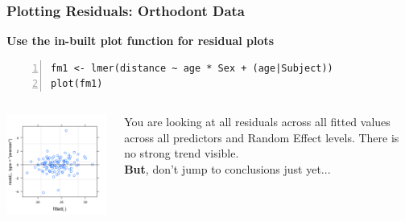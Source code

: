 \documentclass{beamer}
\begin{document}
\begin{frame}[fragile]
    \frametitle{Plotting Residuals: Orthodont Data}
    \textbf{Use the in-built plot function for residual plots}
    \scriptsize\begin{Verbatim}[numbers=left,numbersep=6pt,frame=single]
fm1 <- lmer(distance ~ age * Sex + (age|Subject))
plot(fm1)        
    \end{Verbatim}
    \begin{columns}
        \begin{column}{0.5\textwidth}
            \includegraphics[width=\textwidth]{lectures/day_7_diagnostics_of_mems/figures/unnamed-chunk-25-1.png}
        \end{column}
        \begin{column}{0.5\textwidth}
        \normalsize
            You are looking at all residuals across all fitted values across all predictors and Random Effect levels. There is no strong trend visible.\\
            \textbf{But}, don't jump to conclusions just yet...
        \end{column}
    \end{columns}
\end{frame}
\end{document}
